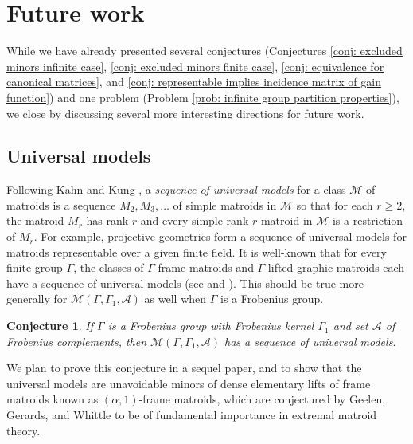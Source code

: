 \documentclass[12pt]{article}
\newtheorem{conjecture}[theorem]{Conjecture}
\theoremstyle{definition}
\newcommand{\cA}{\mathcal{A}}
\newcommand{\cM}{\mathcal{M}}
\begin{document}
 









\section{Future work} \label{sec: future work}
While we have already presented several conjectures (Conjectures \ref{conj: excluded minors infinite case}, \ref{conj: excluded minors finite case}, \ref{conj: equivalence for canonical matrices}, and \ref{conj: representable implies incidence matrix of gain function}) and one problem (Problem \ref{prob: infinite group partition properties}), we close by discussing several more interesting directions for future work.





\subsection{Universal models}
Following Kahn and Kung \cite{Kahn-Kung1982}, a \emph{sequence of universal models} for a class $\cM$ of matroids is a sequence $M_2, M_3, \dots$ of simple matroids in $\cM$ so that for each $r \ge 2$, the matroid $M_r$ has rank $r$ and every simple rank-$r$ matroid in $\cM$ is a restriction of $M_r$.
For example, projective geometries form a sequence of universal models for matroids representable over a given finite field.
It is well-known that for every finite group $\Gamma$, the classes of $\Gamma$-frame matroids and $\Gamma$-lifted-graphic matroids each have a sequence of universal models (see \cite[page 47]{Zaslavsky1991} and \cite[Chapter 4]{Geelen-Nelson-Walsh-2024}).
This should be true more generally for $\cM(\Gamma, \Gamma_1, \cA)$ as well when $\Gamma$ is a Frobenius group.


\begin{conjecture}
If $\Gamma$ is a Frobenius group with Frobenius kernel $\Gamma_1$ and set $\cA$ of Frobenius complements, then $\cM(\Gamma, \Gamma_1, \cA)$ has a sequence of universal models.
\end{conjecture}

We plan to prove this conjecture in a sequel paper, and to show that the universal models are unavoidable minors of dense elementary lifts of frame matroids known as $(\alpha, 1)$-frame matroids, which are conjectured by Geelen, Gerards, and Whittle \cite[Conjecure 7.5]{Structure_Theory} to be of fundamental importance in extremal matroid theory.
\end{document}

